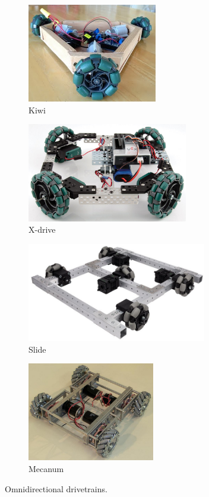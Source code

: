 \begin{figure}[H]
\begin{subfigure}[b]{.45\linewidth}
	\includegraphics[height=1.7in]{imgs/drivetrain_kiwi.png}
	\caption{Kiwi}
\end{subfigure}\begin{subfigure}[b]{.45\linewidth}
	\includegraphics[height=1.7in]{imgs/drivetrain_killough.jpeg}
	\caption{X-drive}
\end{subfigure}

\begin{subfigure}[b]{.45\linewidth}
	\includegraphics[height=1.7in]{imgs/drivetrain_slide.png}
	\caption{Slide}
\end{subfigure}\begin{subfigure}[b]{.45\linewidth}
	\includegraphics[height=1.7in]{imgs/drivetrain_mecanum.png}
	\caption{Mecanum}
\end{subfigure}
\caption{Omnidirectional drivetrains.}
\end{figure}

